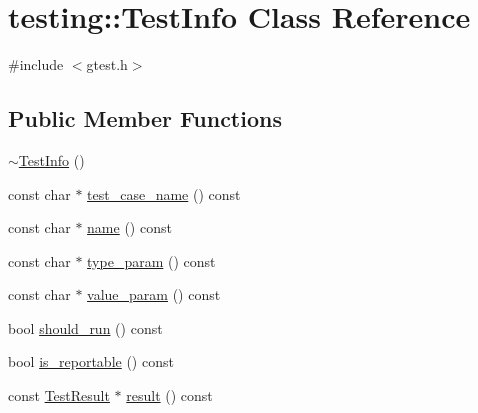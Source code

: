 \hypertarget{classtesting_1_1_test_info}{}\section{testing\+:\+:Test\+Info Class Reference}
\label{classtesting_1_1_test_info}


{\ttfamily \#include $<$gtest.\+h$>$}

\subsection*{Public Member Functions}
\begin{DoxyCompactItemize}
\item 
\hyperlink{classtesting_1_1_test_info_a8d382c1b1b511f0d9112c14684809852}{$\sim$\+Test\+Info} ()
\item 
const char $\ast$ \hyperlink{classtesting_1_1_test_info_a26d22556d04b94c9cd15e28d74fef91c}{test\+\_\+case\+\_\+name} () const 
\item 
const char $\ast$ \hyperlink{classtesting_1_1_test_info_ab3d24cad310f0cde29a80b9a83949ff5}{name} () const 
\item 
const char $\ast$ \hyperlink{classtesting_1_1_test_info_af15d5c533a7237ffc183bc4c924dfcf4}{type\+\_\+param} () const 
\item 
const char $\ast$ \hyperlink{classtesting_1_1_test_info_a9671fbc0effcb32e98803888dc166a66}{value\+\_\+param} () const 
\item 
bool \hyperlink{classtesting_1_1_test_info_a240c9fb051d7b0586ed380c6b4e729e4}{should\+\_\+run} () const 
\item 
bool \hyperlink{classtesting_1_1_test_info_a7ad90aeebb1d6fe3a43c6e3e3427e382}{is\+\_\+reportable} () const 
\item 
const \hyperlink{classtesting_1_1_test_result}{Test\+Result} $\ast$ \hyperlink{classtesting_1_1_test_info_addea8766df3b8abe4cc4103218a49a65}{result} () const 
\end{DoxyCompactItemize}
